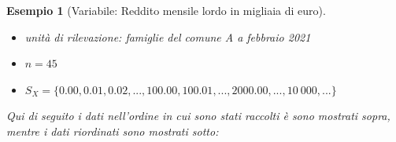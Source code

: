 \documentclass[
  11pt,
]{book}
\providecommand{\tightlist}{%
  \setlength{\itemsep}{0pt}\setlength{\parskip}{0pt}}
\theoremstyle{mytheoremstyle}
\theoremstyle{mydefstyle}
\newtheorem{example}{{Esempio}}[section]
\begin{document}
\begin{example}[Variabile: Reddito mensile lordo in migliaia di euro]
\(\phantom{x}\)

\begin{itemize}
\tightlist
\item
  unità di rilevazione: famiglie del comune A a febbraio 2021
\item
  \(n=45\)
\item
  \(S_X=\{0.00,0.01,0.02,...,100.00,100.01,...,2000.00,...,10~000,...\}\)
\end{itemize}

Qui di seguito i dati nell'ordine in cui sono stati raccolti è sono mostrati sopra, mentre
i dati riordinati sono mostrati sotto:

\vspace{10pt}

\scriptsize


\end{example}
\end{document}
